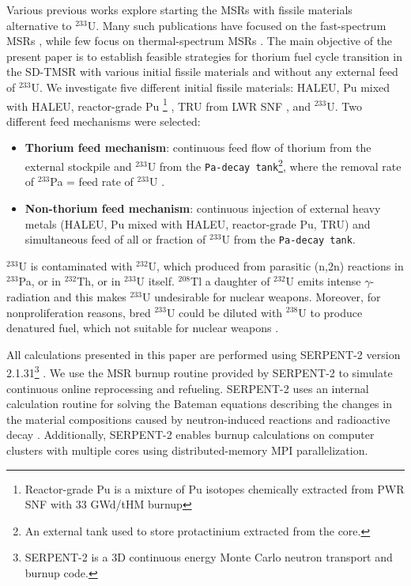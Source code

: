 Various previous works explore starting the
\glspl{MSR} with fissile materials alternative to $^{233}$U. Many such publications have focused on the fast-spectrum \glspl{MSR} \cite{heuer2014towards,ashraf2019modeling,
	ashraf2018nuclear, rykhlevskii_fuel_2019, betzler_impacts_2019,
	fiorina2013investigation}, while few focus on
thermal-spectrum \glspl{MSR} \cite{betzler2016modeling,
	zou2018transition,zou2018preliminary}.
The main objective of the present paper is to establish feasible strategies for thorium fuel cycle transition in the SD-TMSR with
various initial fissile materials and without any external feed of $^{233}$U. We investigate five different
initial fissile materials: \gls{HALEU}, Pu mixed with \gls{HALEU}, reactor-grade Pu \footnote{Reactor-grade Pu is a mixture of Pu isotopes chemically extracted from PWR SNF with 33 GWd/tHM burnup} \cite{marka1993explosive}, \gls{TRU} from LWR SNF \cite{de2000scenarios}, and $^{233}$U. Two different feed mechanisms were selected:

\begin{itemize}
	\item \textbf{Thorium feed mechanism}: continuous feed flow of thorium from the external stockpile and $^{233}$U from the \texttt{Pa-decay tank}\footnote{An external tank used to store protactinium extracted from the core.}, where the removal rate of $^{233}$Pa = feed rate of $^{233}$U \cite{betzler2016modeling}.
	\item \textbf{Non-thorium feed mechanism}: continuous injection of external heavy metals (\gls{HALEU}, Pu mixed with \gls{HALEU}, reactor-grade Pu, \gls{TRU}) and simultaneous feed of all or fraction of $^{233}$U from the \texttt{Pa-decay tank}.
\end{itemize}

$^{233}$U is contaminated with $^{232}$U, which produced from parasitic (n,2n) reactions in $^{233}$Pa, or in $^{232}$Th, or in $^{233}$U itself. $^{208}$Tl a daughter of $^{232}$U emits intense $\gamma$-radiation and this makes $^{233}$U undesirable for nuclear weapons. Moreover, for nonproliferation reasons, bred $^{233}$U could be diluted with $^{238}$U to produce denatured fuel, which not suitable for nuclear weapons \cite{dolan2017molten}.

All calculations presented in this paper are performed using SERPENT-2 version 2.1.31\footnote{SERPENT-2 is a 3D continuous energy Monte Carlo neutron 
	transport and burnup code.} \cite{leppanen2014serpent}. We use the MSR burnup routine provided by SERPENT-2 to simulate continuous online reprocessing and refueling. SERPENT-2 uses an internal calculation routine for solving the Bateman equations describing the changes in the material compositions caused by neutron-induced reactions and radioactive decay \cite{leppanen2014serpent}. Additionally, SERPENT-2 enables burnup calculations on computer clusters with multiple cores using distributed-memory MPI parallelization.

